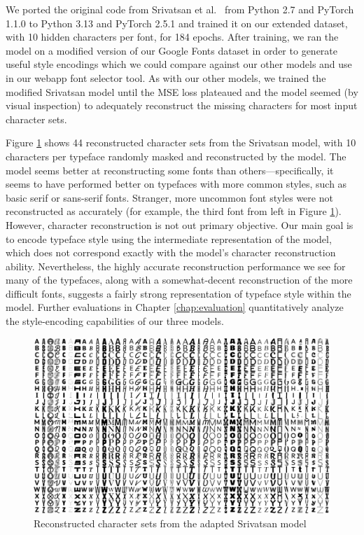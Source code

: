 We ported the original code from Srivatsan et al.\ \cite{srivatsan2020} from Python 2.7 and PyTorch 1.1.0 to Python 3.13 and PyTorch 2.5.1 and trained it on our extended dataset, with 10 hidden characters per font, for 184 epochs. After training, we ran the model on a modified version of our Google Fonts dataset in order to generate useful style encodings which we could compare against our other models and use in our webapp font selector tool. As with our other models, we trained the modified Srivatsan model until the MSE loss plateaued and the model seemed (by visual inspection) to adequately reconstruct the missing characters for most input character sets.

Figure \ref{fig:srivatsan-reconstructions} shows 44 reconstructed character sets from the Srivatsan model, with 10 characters per typeface randomly masked and reconstructed by the model. The model seems better at reconstructing some fonts than others---specifically, it seems to have performed better on typefaces with more common styles, such as basic serif or sans-serif fonts. Stranger, more uncommon font styles were not reconstructed as accurately (for example, the third font from left in Figure \ref{fig:srivatsan-reconstructions}). However, character reconstruction is not out primary objective. Our main goal is to encode typeface style using the intermediate representation of the model, which does not correspond exactly with the model's character reconstruction ability. Nevertheless, the highly accurate reconstruction performance we see for many of the typefaces, along with a somewhat-decent reconstruction of the more difficult fonts, suggests a fairly strong representation of typeface style within the model. Further evaluations in Chapter \ref{chap:evaluation} quantitatively analyze the style-encoding capabilities of our three models.

\begin{figure}[]
    \centering
    \includegraphics[width=\textwidth]{images/srivatsan-reconstructions.png}
    \caption{Reconstructed character sets from the adapted Srivatsan model}
    \label{fig:srivatsan-reconstructions}
\end{figure}

